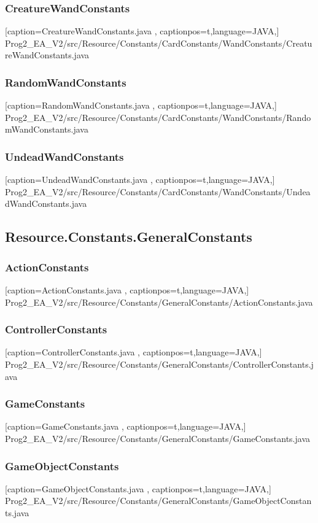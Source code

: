\documentclass[a4paper,12pt]{scrartcl}
\begin{document}
	\subsubsection{CreatureWandConstants}
	
	[caption={CreatureWandConstants.java}
	\label{lst:javaclass},
	captionpos=t,language=JAVA,]
	{Prog2_EA_V2/src/Resource/Constants/CardConstants/WandConstants/CreatureWandConstants.java}
	\subsubsection{RandomWandConstants}
	
	[caption={RandomWandConstants.java}
	\label{lst:javaclass},
	captionpos=t,language=JAVA,]
	{Prog2_EA_V2/src/Resource/Constants/CardConstants/WandConstants/RandomWandConstants.java}
	\subsubsection{UndeadWandConstants}
	
	[caption={UndeadWandConstants.java}
	\label{lst:javaclass},
	captionpos=t,language=JAVA,]
	{Prog2_EA_V2/src/Resource/Constants/CardConstants/WandConstants/UndeadWandConstants.java}
	\subsection{Resource.Constants.GeneralConstants}
    \subsubsection{ActionConstants}
	
	[caption={ActionConstants.java}
	\label{lst:javaclass},
	captionpos=t,language=JAVA,]
	{Prog2_EA_V2/src/Resource/Constants/GeneralConstants/ActionConstants.java}
	\subsubsection{ControllerConstants}
	
	[caption={ControllerConstants.java}
	\label{lst:javaclass},
	captionpos=t,language=JAVA,]
	{Prog2_EA_V2/src/Resource/Constants/GeneralConstants/ControllerConstants.java}
	\subsubsection{GameConstants}
	
	[caption={GameConstants.java}
	\label{lst:javaclass},
	captionpos=t,language=JAVA,]
	{Prog2_EA_V2/src/Resource/Constants/GeneralConstants/GameConstants.java}
	\subsubsection{GameObjectConstants}
	
	[caption={GameObjectConstants.java}
	\label{lst:javaclass},
	captionpos=t,language=JAVA,]
	{Prog2_EA_V2/src/Resource/Constants/GeneralConstants/GameObjectConstants.java}
\end{document}
